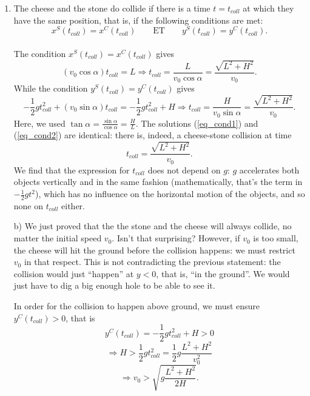 \begin{enumerate}
\item The cheese and the stone do collide if there is a time $t=t_{coll}$ at which they have the same position, that is, if the following conditions are met:
\[ 
x^S(t_{coll}) = x^C(t_{coll})\qquad \textrm{ET} \qquad y^S(t_{coll}) = y^C(t_{coll}). 
\]\\
The condition $x^S(t_{coll}) = x^C(t_{coll})$ gives
\begin{equation}
(v_0\cos\alpha) t_{coll} = L \Rightarrow t_{coll} = \frac{L}{v_0\cos\alpha} = \frac{\sqrt{L^2+H^2}}{v_0}.
\label{eq_cond1}
\end{equation}
While the condition $y^S(t_{coll}) = y^C(t_{coll})$ gives
\begin{equation}
-\frac{1}{2}gt_{coll}^2 + (v_0\sin\alpha) t_{coll} = -\frac{1}{2}gt_{coll}^2 +H \Rightarrow t_{coll} = \frac{H}{v_0\sin\alpha} = \frac{\sqrt{L^2+H^2}}{v_0}.
\label{eq_cond2}
\end{equation}
Here, we used $\tan\alpha = \frac{\sin\alpha}{\cos\alpha} = \frac{H}{L}$.
The solutions (\ref{eq_cond1}) and (\ref{eq_cond2}) are identical: there is, indeed, a cheese-stone collision at time 
\begin{equation}\label{eq_tcoll} t_{coll}=\frac{\sqrt{L^2+H^2}}{v_0}. 
\end{equation}
We find that the expression for $t_{coll}$ does not depend on $g$: $g$ accelerates both objects vertically and in the same fashion (mathematically, that's the term in $-\frac{1}{2}g t^2$), which has no influence on the horizontal motion of the objects, and so none on $t_{coll}$ either. 
\item[b)] We just proved that the the stone and the cheese will always collide, no matter the initial speed $v_0$. Isn't that surprising? However, if $v_0$ is too small, the cheese will hit the ground before the collision happens: we must restrict $v_0$ in that respect. This is not contradicting the previous statement: the collision would just ``happen'' at $y<0$, that is, ``in the ground''. We would just have to dig a big enough hole to be able to see it.

In order for the collision to happen above ground, we must ensure $y^C(t_{coll})>0$, that is
\[
{y}^C(t_{coll}) =  -\frac{1}{2}gt_{coll}^2 +H > 0
\]
\[
\Rightarrow H>\frac{1}{2}gt_{coll}^2 = \frac{1}{2}g\frac{L^2+H^2}{v_0^2}
\]
\begin{equation}\label{eq_condv0}
\Rightarrow v_0 > \sqrt{g\frac{L^2+H^2}{2H}}.
\end{equation}


\end{enumerate}
